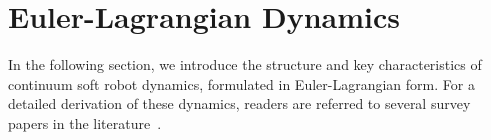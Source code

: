 \section{Euler-Lagrangian Dynamics}\label{sec:background:dynamics}
In the following section, we introduce the structure and key characteristics of continuum soft robot dynamics, formulated in Euler-Lagrangian form. For a detailed derivation of these dynamics, readers are referred to several survey papers in the literature~\citep{gazzola2018forward, armanini2023soft, alessi2024rod, della2023model}.


